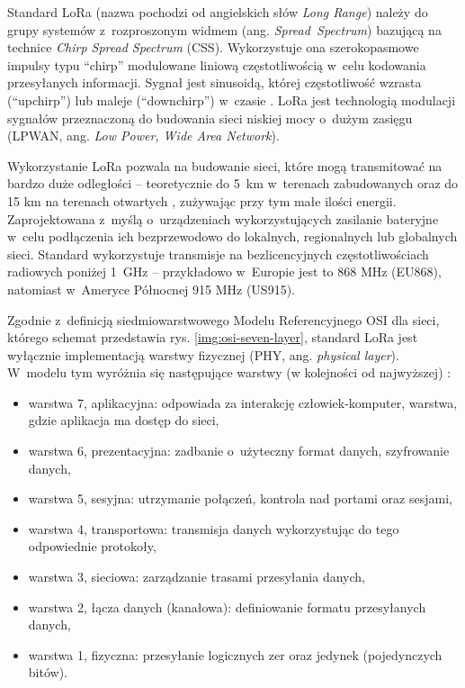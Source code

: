 Standard LoRa (nazwa pochodzi od angielskich słów \textsl{Long Range}) należy do grupy systemów z~rozproszonym widmem
(ang. \textsl{Spread~Spectrum}) bazującą na technice \textsl{Chirp Spread Spectrum} (CSS). Wykorzystuje ona
szerokopasmowe impulsy typu \enquote{chirp} modulowane liniową częstotliwością w~celu kodowania przesyłanych informacji.
Sygnał jest sinusoidą, której częstotliwość wzrasta (\enquote{upchirp}) lub maleje (\enquote{downchirp}) w~czasie
\cite{semtech-lora-lorawan,ieee-802-15-4-2006}. LoRa jest technologią modulacji sygnałów przeznaczoną do budowania sieci
niskiej mocy o~dużym zasięgu (LPWAN, ang. \textsl{Low Power, Wide Area Network}).

Wykorzystanie LoRa pozwala na budowanie sieci, które mogą transmitować na bardzo duże odległości -- teoretycznie do 5~km
w~terenach zabudowanych oraz do 15 km na terenach otwartych \cite{semtech-lora-lorawan}, zużywając przy tym małe ilości
energii. Zaprojektowana z~myślą o~urządzeniach wykorzystujących zasilanie bateryjne w~celu podłączenia ich bezprzewodowo
do lokalnych, regionalnych lub globalnych sieci. Standard wykorzystuje transmisje na bezlicencyjnych częstotliwościach
radiowych poniżej 1~GHz -- przykładowo w~Europie jest to 868 MHz (EU868), natomiast w~Ameryce Północnej 915 MHz (US915).

Zgodnie z~definicją siedmiowarstwowego Modelu Referencyjnego OSI dla sieci, którego schemat przedstawia rys.
\ref{img:osi-seven-layer}, standard LoRa jest wyłącznie implementacją warstwy fizycznej (PHY, ang. \textsl{physical
    layer}). W~modelu tym wyróżnia się następujące warstwy (w kolejności od najwyższej) \cite{osi-model}:
\begin{itemize}[label=--]
    \item warstwa 7, aplikacyjna: odpowiada za interakcję człowiek-komputer, warstwa, gdzie aplikacja ma dostęp do sieci,
    \item warstwa 6, prezentacyjna: zadbanie o~użyteczny format danych, szyfrowanie danych,
    \item warstwa 5, sesyjna: utrzymanie połączeń, kontrola nad portami oraz sesjami,
    \item warstwa 4, transportowa: transmisja danych wykorzystując do tego odpowiednie protokoły,
    \item warstwa 3, sieciowa: zarządzanie trasami przesyłania danych,
    \item warstwa 2, łącza danych (kanałowa): definiowanie formatu przesyłanych danych,
    \item warstwa 1, fizyczna: przesyłanie logicznych zer oraz jedynek (pojedynczych bitów).
\end{itemize}

